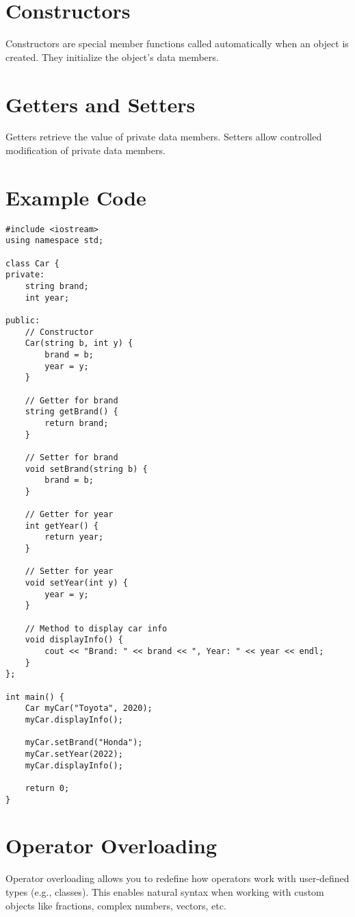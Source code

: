 \documentclass{article}
\begin{document}
\section{Constructors}
Constructors are special member functions called automatically when an object is created. They initialize the object's data members.

\section{Getters and Setters}
Getters retrieve the value of private data members. Setters allow controlled modification of private data members.

\section{Example Code}
\begin{lstlisting}[style=cppstyle]
#include <iostream>
using namespace std;

class Car {
private:
    string brand;
    int year;

public:
    // Constructor
    Car(string b, int y) {
        brand = b;
        year = y;
    }

    // Getter for brand
    string getBrand() {
        return brand;
    }

    // Setter for brand
    void setBrand(string b) {
        brand = b;
    }

    // Getter for year
    int getYear() {
        return year;
    }

    // Setter for year
    void setYear(int y) {
        year = y;
    }

    // Method to display car info
    void displayInfo() {
        cout << "Brand: " << brand << ", Year: " << year << endl;
    }
};

int main() {
    Car myCar("Toyota", 2020);
    myCar.displayInfo();
    
    myCar.setBrand("Honda");
    myCar.setYear(2022);
    myCar.displayInfo();

    return 0;
}
\end{lstlisting}

\section{Operator Overloading}

Operator overloading allows you to redefine how operators work with user-defined types (e.g., classes). This enables natural syntax when working with custom objects like fractions, complex numbers, vectors, etc.
\end{document}
